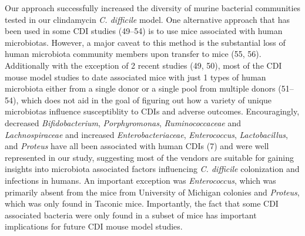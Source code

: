 \documentclass[11pt,]{article}
\begin{document}
Our approach successfully increased the diversity of murine bacterial
communities tested in our clindamycin \emph{C. difficile} model. One
alternative approach that has been used in some CDI studies (49--54) is
to use mice associated with human microbiotas. However, a major caveat
to this method is the substantial loss of human microbiota community
members upon transfer to mice (55, 56). Additionally with the exception
of 2 recent studies (49, 50), most of the CDI mouse model studies to
date associated mice with just 1 types of human microbiota either from a
single donor or a single pool from multiple donors (51--54), which does
not aid in the goal of figuring out how a variety of unique microbiotas
influence susceptiblity to CDIs and adverse outcomes. Encouragingly,
decreased \emph{Bifidobacterium}, \emph{Porphyromonas},
\emph{Ruminococcaceae} and \emph{Lachnospiraceae} and increased
\emph{Enterobacteriaceae}, \emph{Enterococcus}, \emph{Lactobacillus},
and \emph{Proteus} have all been associated with human CDIs (7) and were
well represented in our study, suggesting most of the vendors are
suitable for gaining insights into microbiota associated factors
influencing \emph{C. difficile} colonization and infections in humans.
An important exception was \emph{Enterococcus}, which was primarily
absent from the mice from University of Michigan colonies and
\emph{Proteus}, which was only found in Taconic mice. Importantly, the
fact that some CDI associated bacteria were only found in a subset of
mice has important implications for future CDI mouse model studies.
\end{document}

